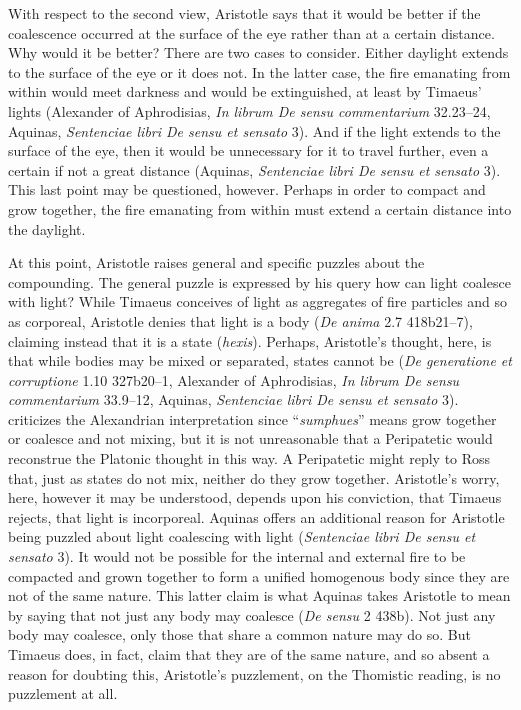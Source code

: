 With respect to the second view, Aristotle says that it would be better if the coalescence occurred at the surface of the eye rather than at a certain distance. Why would it be better? There are two cases to consider. Either daylight extends to the surface of the eye or it does not. In the latter case, the fire emanating from within would meet darkness and would be extinguished, at least by Timaeus' lights (Alexander of Aphrodisias, \emph{In librum De sensu commentarium} 32.23--24, Aquinas, \emph{Sentenciae libri De sensu et sensato} 3). And if the light extends to the surface of the eye, then it would be unnecessary for it to travel further, even a certain if not a great distance (Aquinas, \emph{Sentenciae libri De sensu et sensato} 3). This last point may be questioned, however. Perhaps in order to compact and grow together, the fire emanating from within must extend a certain distance into the daylight.

At this point, Aristotle raises general and specific puzzles about the compounding. The general puzzle is expressed by his query how can light coalesce with light? While Timaeus conceives of light as aggregates of fire particles and so as corporeal, Aristotle denies that light is a body (\emph{De anima} 2.7 418b21--7), claiming instead that it is a state (\emph{hexis}). Perhaps, Aristotle's thought, here, is that while bodies may be mixed or separated, states cannot be (\emph{De generatione et corruptione} 1.10 327b20--1, Alexander of Aphrodisias, \emph{In librum De sensu commentarium} 33.9--12, Aquinas, \emph{Sentenciae libri De sensu et sensato} 3). \citet[140--1]{Ross:1906xi} criticizes the Alexandrian interpretation since ``\emph{sumphues}'' means grow together or coalesce and not mixing, but it is not unreasonable that a Peripatetic would reconstrue the Platonic thought in this way. A Peripatetic might reply to Ross that, just as states do not mix, neither do they grow together. Aristotle's worry, here, however it may be understood, depends upon his conviction, that Timaeus rejects, that light is incorporeal. Aquinas offers an additional reason for Aristotle being puzzled about light coalescing with light (\emph{Sentenciae libri De sensu et sensato} 3). It would not be possible for the internal and external fire to be compacted and grown together to form a unified homogenous body since they are not of the same nature. This latter claim is what Aquinas takes Aristotle to mean by saying that not just any body may coalesce (\emph{De sensu} 2 438b). Not just any body may coalesce, only those that share a common nature may do so. But Timaeus does, in fact, claim that they are of the same nature, and so absent a reason for doubting this, Aristotle's puzzlement, on the Thomistic reading, is no puzzlement at all. 

